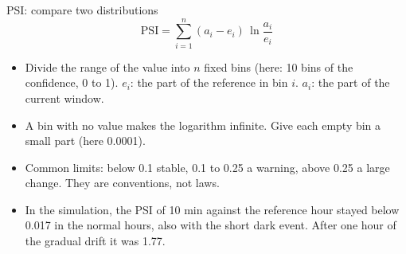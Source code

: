\begin{frame}{PSI: compare two distributions}
  \small
  \[ \text{PSI} = \sum_{i=1}^{n} (a_i - e_i)\,\ln\frac{a_i}{e_i} \]
  \begin{itemize}
    \item Divide the range of the value into $n$ fixed bins (here: 10 bins
          of the confidence, 0 to 1). $e_i$: the part of the reference in
          bin $i$. $a_i$: the part of the current window.
    \item A bin with no value makes the logarithm infinite. Give each empty
          bin a small part (here 0.0001).
    \item Common limits: below 0.1 stable, 0.1 to 0.25 a warning, above 0.25
          a large change. They are conventions, not laws.
    \item In the simulation, the PSI of 10 min against the reference hour
          stayed below 0.017 in the normal hours, also with the short dark
          event. After one hour of the gradual drift it was 1.77.
  \end{itemize}
\end{frame}

